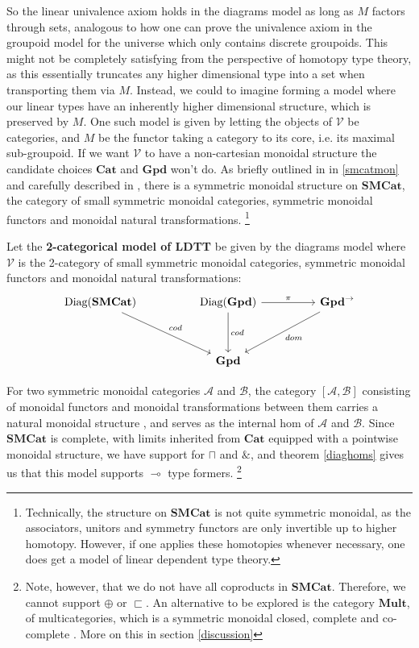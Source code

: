 So the linear univalence axiom holds in the diagrams model as long as $M$ factors through sets, analogous to how one can prove the univalence axiom in the groupoid model for the universe which only contains discrete groupoids. This might not be completely satisfying from the perspective of homotopy type theory, as this essentially truncates any higher dimensional type into a set when transporting them via $M$. Instead, we could to imagine forming a model where our linear types have an inherently higher dimensional structure, which is preserved by $M$. One such model is given by letting the objects of $\mathcal{V}$ be categories, and $M$ be the functor taking a category to its core, i.e. its maximal sub-groupoid. If we want $\mathcal{V}$ to have a non-cartesian monoidal structure the candidate choices $\mathbf{Cat}$ and $\mathbf{Gpd}$ won't do. As briefly outlined in in \ref{smcatmon} and carefully described in \cite{smcat}, there is a symmetric monoidal structure on $\mathbf{SMCat}$, the category of small symmetric monoidal categories, symmetric monoidal functors and monoidal natural transformations. \footnote{Technically, the structure on $\mathbf{SMCat}$ is not quite symmetric monoidal, as the associators, unitors and symmetry functors are only invertible up to higher homotopy. However, if one applies these homotopies whenever necessary, one does get a model of linear dependent type theory.}
\begin{defn}
 Let the \textbf{2-categorical model of LDTT} be given by the diagrams model where $\mathcal{V}$ is the 2-category of small symmetric monoidal categories, symmetric monoidal functors and monoidal natural transformations:
  \[
    \ti
    \diag(\mathbf{SMCat}) \ar[rd, "cod"] & \diag(\mathbf{Gpd}) \ar[r, "\pi"] \ar[d, "cod"] & \mathbf{Gpd}^\to \ar[ld, "dom"]\\
    & \mathbf{Gpd}
    \kz
  \]
\end{defn}
For two symmetric monoidal categories $\mathcal{A}$ and $\mathcal{B}$, the category $[\mathcal{A}, \mathcal{B}]$ consisting of monoidal functors and monoidal transformations between them carries a natural monoidal structure \cite{smcat}, and serves as the internal hom of $\mathcal{A}$ and $\mathcal{B}$. Since $\mathbf{SMCat}$ is complete, with limits inherited from $\mathbf{Cat}$ equipped with a pointwise monoidal structure, we have support for $\sqcap$ and $\&$, and theorem \ref{diaghoms} gives us that this model supports $\multimap$ type formers. \footnote{Note, however, that we do not have all coproducts in $\mathbf{SMCat}$. Therefore, we cannot support $\oplus$ or $\sqsubset$. An alternative to be explored is the category $\mathbf{Mult}$, of multicategories, which is a symmetric monoidal closed, complete and co-complete \cite{elmendorf2009permutative}. More on this in section \ref{discussion}}
